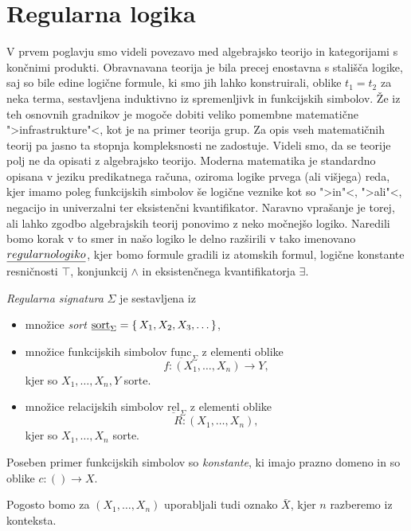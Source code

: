 \documentclass[../kategoricna_logika.tex]{subfiles}
\begin{document}
\section{Regularna logika}
V prvem poglavju smo videli povezavo med algebrajsko teorijo in
kategorijami s končnimi produkti. Obravnavana teorija je
bila precej enostavna s stališča logike, saj so bile edine logične
formule, ki smo jih lahko konstruirali, oblike $t_1 = t_2$ za neka
terma, sestavljena induktivno iz spremenljivk in funkcijskih simbolov.
Že iz teh osnovnih gradnikov je mogoče dobiti veliko pomembne
matematične ">infrastrukture"<, kot je na primer teorija grup.  Za
opis vseh matematičnih teorij pa jasno ta stopnja kompleksnosti ne
zadostuje.  Videli smo, da se teorije polj ne da opisati z algebrajsko
teorijo.  Moderna matematika je standardno opisana v jeziku predikatnega
računa, oziroma logike prvega (ali višjega) reda, kjer imamo poleg
funkcijskih simbolov še logične veznike kot so ">in"<, ">ali"<,
negacijo in univerzalni ter eksistenčni kvantifikator.  Naravno
vprašanje je torej, ali lahko zgodbo algebrajskih teorij ponovimo z
neko močnejšo logiko. Naredili bomo korak v to
smer in našo logiko le delno razširili v tako imenovano
$\emph{regularno logiko}$, kjer bomo formule gradili iz atomskih
formul, logične konstante resničnosti $\top$, konjunkcij $\wedge$ in
eksistenčnega kvantifikatorja $\exists$.
\begin{definicija}
  \emph{Regularna signatura} $\Sigma$ je sestavljena iz
  \begin{itemize}
  \item množice \emph{sort}
    $\underline{\mathrm{sort}}_\Sigma = \lbrace\,X_1, X_2, X_3, \ldots\,\rbrace$,
  \item množice funkcijskih simbolov
    $\underline{\mathrm{func}}_\Sigma$ z elementi oblike
    \[ f : (X_1, \ldots, X_n) \to Y,\]
    kjer so $X_1,\ldots, X_n,Y$ sorte.
  \item množice relacijskih simbolov
    $\underline{\mathrm{rel}}_\Sigma$ z elementi oblike
    \[ R : (X_1,\ldots, X_n),\]
    kjer so $X_1,\ldots, X_n$ sorte.
  \end{itemize}
\end{definicija}
\begin{opomba}
  Poseben primer funkcijskih simbolov so \emph{konstante}, ki imajo
  prazno domeno in so oblike $c : () \to X$. 
\end{opomba}
Pogosto bomo za $(X_1, \ldots, X_n)$ uporabljali tudi oznako
$\bar{X}$, kjer $n$ razberemo iz konteksta.
\end{document}
